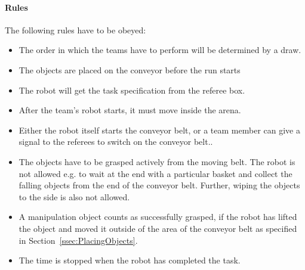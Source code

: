 

%



\paragraph{Rules}
The following rules have to be obeyed:

\begin{itemize}
\item The order in which the teams have to perform will be determined by a draw.
\item The objects are placed on the conveyor before the run starts
\item The robot will get the task specification from the referee box.
\item After the team's robot starts, it must move inside the arena.
\item Either the robot itself starts the conveyor belt, or a team member can give a signal to the referees to switch on the conveyor belt..
\item The objects have to be grasped actively from the moving belt. The robot is not allowed e.g. to wait at the end with a particular basket and collect the falling objects from the end of the conveyor belt. Further, wiping the objects to the side is also not allowed.
\item A manipulation object counts as successfully grasped, if the robot has lifted the object and moved it outside of the area of the conveyor belt as specified in Section~\ref{ssec:PlacingObjects}.
\item The time is stopped when the robot has completed the task.
\end{itemize}



